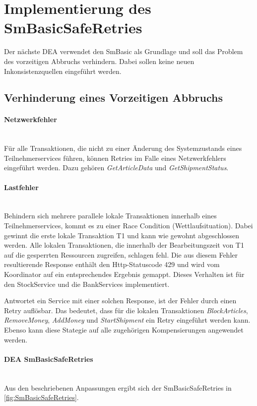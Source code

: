 \section{Implementierung des SmBasicSafeRetries}

Der nächste DEA verwendet den SmBasic als Grundlage und soll das Problem des vorzeitigen Abbruchs verhindern. Dabei sollen keine neuen Inkonsistenzquellen eingeführt werden. 

\subsection{Verhinderung eines Vorzeitigen Abbruchs}

\paragraph*{Netzwerkfehler} \mbox{}\\
Für alle Transaktionen, die nicht zu einer Änderung des Systemzustands eines Teilnehmerservices führen, können Retries im Falle eines Netzwerkfehlers eingeführt werden. Dazu gehören \textit{GetArticleData} und \textit{GetShipmentStatus}. 

\paragraph*{Lastfehler} \mbox{}\\
Behindern sich mehrere parallele lokale Transaktionen innerhalb eines Teilnehmerservices, kommt es zu einer Race Condition (Wettlaufsituation). Dabei gewinnt die erste lokale Transaktion T1 und kann wie gewohnt abgeschlossen werden. Alle lokalen Transaktionen, die innerhalb der Bearbeitungszeit von T1 auf die gesperrten Ressourcen zugreifen, schlagen fehl. Die aus diesem Fehler resultierende Response enthält den Http-Statuscode 429 und wird vom Koordinator auf ein entsprechendes Ergebnis gemappt. Dieses Verhalten ist für den StockService und die BankServices implementiert. 

Antwortet ein Service mit einer solchen Response, ist der Fehler durch einen Retry auflösbar. Das bedeutet, dass für die lokalen Transaktionen \textit{BlockArticles}, \textit{RemoveMoney}, \textit{AddMoney} und \textit{StartShipment} ein Retry eingeführt werden kann. Ebenso kann diese Stategie auf alle zugehörigen Kompensierungen angewendet werden.

\paragraph*{DEA SmBasicSafeRetries} \mbox{}\\
Aus den beschriebenen Anpassungen ergibt sich der SmBasicSafeRetries in \cref{fig:SmBasicSafeRetries}. 

